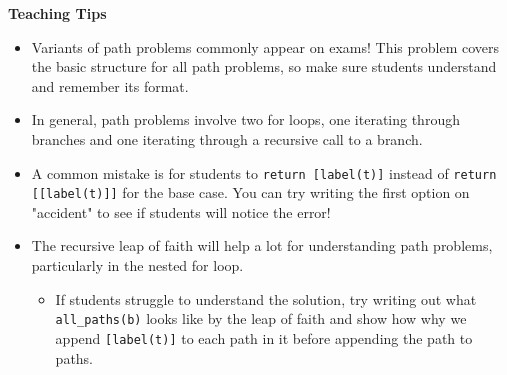 \begin{blocksection}
\begin{guide}
  \textbf{Teaching Tips}
  \begin{itemize}
      \item Variants of path problems commonly appear on exams! This problem covers the basic structure for all path problems, so make sure students understand and remember its format.
      \item In general, path problems involve two for loops, one iterating through branches and one iterating through a recursive call to a branch.
      \item A common mistake is for students to \lstinline$return [label(t)]$ instead of \lstinline$return [[label(t)]]$ for the base case. You can try writing the first option on "accident" to see if students will notice the error!
      \item The recursive leap of faith will help a lot for understanding path problems, particularly in the nested for loop.
      \begin{itemize}
        \item If students struggle to understand the solution, try writing out what \lstinline$all_paths(b)$ looks like by the leap of faith and show how why we append \lstinline$[label(t)]$ to each path in it before appending the path to paths.
      \end{itemize}
  \end{itemize}
\end{guide}
\end{blocksection}
